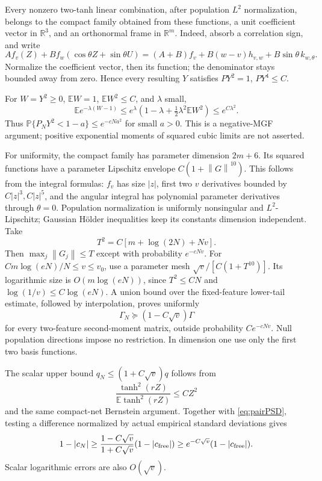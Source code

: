 \documentclass[11pt]{article}
\newcommand{\R}{\mathbb R}\newcommand{\E}{\mathbb E}\newcommand{\Pp}{\mathbb P}
\newcommand{\norm}[1]{\left\lVert#1\right\rVert}
\begin{document}
Every nonzero two-tanh linear combination, after population $L^2$ normalization, belongs to the compact family obtained from these functions, a unit coefficient vector in $\R^3$, and an orthonormal frame in $\R^m$. Indeed, absorb a correlation sign, and write
\[
 A f_v(Z)+B f_w(\cos\theta Z+\sin\theta U)
 =(A+B)f_v+B(w-v)h_{v,w}+B\sin\theta\,k_{w,\theta}.
\]
Normalize the coefficient vector, then its function; the denominator stays bounded away from zero. Hence every resulting $Y$ satisfies $PY^2=1$, $PY^4\le C$.

For $W=Y^2\ge0$, $\E W=1$, $\E W^2\le C$, and $\lambda$ small,
\[
 \E e^{-\lambda(W-1)}\le e^\lambda(1-\lambda+\tfrac12\lambda^2\E W^2)\le e^{C\lambda^2}.
\]
Thus $\Pp\{P_NY^2<1-a\}\le e^{-cNa^2}$ for small $a>0$. This is a negative-MGF argument; positive exponential moments of squared cubic limits are not asserted.

For uniformity, the compact family has parameter dimension $2m+6$. Its squared functions have a parameter Lipschitz envelope $C(1+\norm G^{10})$. This follows from the integral formulas: $f_v$ has size $|z|$, first two $v$ derivatives bounded by $C|z|^3,C|z|^5$, and the angular integral has polynomial parameter derivatives through $\theta=0$. Population normalization is uniformly nonsingular and $L^2$-Lipschitz; Gaussian H\"older inequalities keep its constants dimension independent.
Take
\[
 T^2=C[m+\log(2N)+Nv].
\]
Then $\max_j\norm{G_j}\le T$ except with probability $e^{-cNv}$. For $Cm\log(eN)/N\le v\le v_0$, use a parameter mesh $\sqrt v/[C(1+T^{10})]$. Its logarithmic size is $O(m\log(eN))$, since $T^2\le CN$ and $\log(1/v)\le C\log(eN)$. A union bound over the fixed-feature lower-tail estimate, followed by interpolation, proves uniformly
\begin{equation}\label{eq:pairPSD}
 \Gamma_N\succeq(1-C\sqrt v)\Gamma
\end{equation}
for every two-feature second-moment matrix, outside probability $Ce^{-cNv}$. Null population directions impose no restriction. In dimension one use only the first two basis functions.

The scalar upper bound $q_N\le(1+C\sqrt v)q$ follows from\[\frac{\tanh^2(rZ)}{\E\tanh^2(rZ)}\le CZ^2\]and the same compact-net Bernstein argument. Together with \eqref{eq:pairPSD}, testing a difference normalized by actual empirical standard deviations gives
\begin{equation}\label{eq:pairgap}
 1-|c_N|\ge\frac{1-C\sqrt v}{1+C\sqrt v}(1-|c_{\rm free}|)
 \ge e^{-C\sqrt v}(1-|c_{\rm free}|).
\end{equation}
Scalar logarithmic errors are also $O(\sqrt v)$.
\end{document}
